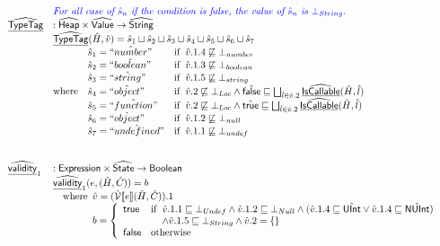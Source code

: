 \[\begin{array}{ll}
& {\color{blue} \textit{For all case of }\hat{s}_n\textit{ if the condition is false, the value of }\hat{s}_n\textit{ is }\bot_{String}.} \\
\widehat{\underline{\sf TypeTag}} & : \widehat{\mbox{\textsf{Heap}}} \times \widehat{\mbox{\textsf{Value}}} \rightarrow \widehat{\mbox{\textsf{String}}}\\
& \widehat{\underline{\sf TypeTag}}(\hat{H},\hat{v}) = \hat{s}_1\sqcup\hat{s}_2\sqcup\hat{s}_3\sqcup\hat{s}_4\sqcup\hat{s}_5\sqcup\hat{s}_6\sqcup\hat{s}_7 \\
& {\rm where}\begin{array}[t]{l}
  \begin{array}{ll}
  \hat{s}_1 = \hat{``number"} & {\rm if}\begin{array}[t]{l}\hat{v}.1.4\not\sqsubseteq\bot_{number}\end{array} \\
  \hat{s}_2 = \hat{``boolean"} & {\rm if}\begin{array}[t]{l}\hat{v}.1.3\not\sqsubseteq\bot_{boolean}\end{array} \\
  \hat{s}_3 = \hat{``string"} & {\rm if}\begin{array}[t]{l}\hat{v}.1.5\not\sqsubseteq\bot_{string}\end{array} \\
  \hat{s}_4 = \hat{``object"} & {\rm if}\begin{array}[t]{l}\hat{v}.2\not\sqsubseteq\bot_{Loc}\land\hat{\mbox{\textsf{false}}}\sqsubseteq\bigsqcup_{\hat{l}\in\hat{v}.2}\widehat{\underline{\sf IsCallable}}(\hat{H},\hat{l})\end{array} \\
  \hat{s}_5 = \hat{``function"} & {\rm if}\begin{array}[t]{l}\hat{v}.2\not\sqsubseteq\bot_{Loc}\land\hat{\mbox{\textsf{true}}}\sqsubseteq\bigsqcup_{\hat{l}\in\hat{v}.2}\widehat{\underline{\sf IsCallable}}(\hat{H},\hat{l})\end{array} \\
  \hat{s}_6 = \hat{``object"} & {\rm if}\begin{array}[t]{l}\hat{v}.1.2\not\sqsubseteq\bot_{null}\end{array} \\
  \hat{s}_7 = \hat{``undefined"} & {\rm if}\begin{array}[t]{l}\hat{v}.1.1\not\sqsubseteq\bot_{undef}\end{array} \\
  \end{array}\\
  \end{array}\\
\\
\\

\widehat{\underline{\sf validity}}_1 & : \sf{Expression} \times \widehat{\mbox{\textsf{State}}} \rightarrow {\sf Boolean}\\
& \widehat{\underline{\sf validity}}_1(e, (\hat{H}, \hat{C})) = b\\
& \quad{\rm where}\begin{array}[t]{l}
  \hat{v} = (\hat{\mathcal{V}} \llbracket e \rrbracket (\hat{H}, \hat{C})).1\\
  b = \left\{
    \begin{array}{ll}
      \mbox{\textsf{true}} & 
        {\rm if}\begin{array}[t]{l} \hat{v}.1.1 \sqsubseteq \bot_{Undef} \land \hat{v}.1.2 \sqsubseteq \bot_{Null} \land (\hat{v}.1.4 \sqsubseteq \hat{\sf UInt} \lor \hat{v}.1.4 \sqsubseteq \hat{\sf NUInt})\\
           \land \hat{v}.1.5 \sqsubseteq \bot_{String} \land \hat{v}.2 = \{\} \end{array}\\
      \mbox{\textsf{false}} & {\rm otherwise}
    \end{array}
  \right.
\end{array}\\
\\


\end{array}\]
